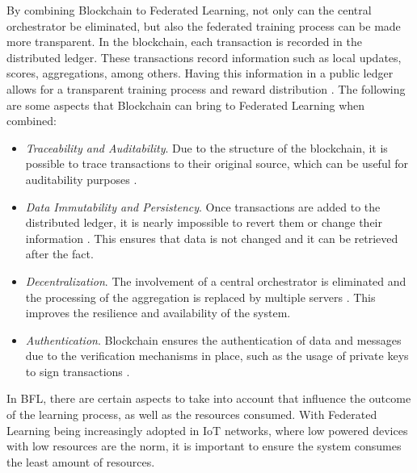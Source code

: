 By combining Blockchain to Federated Learning, not only can the central orchestrator be eliminated, but also the federated training process can be made more transparent. In the blockchain, each transaction is recorded in the distributed ledger. These transactions record information such as local updates, scores, aggregations, among others. Having this information in a public ledger allows for a transparent training process and reward distribution \cite{li_blockchain_2021}. The following are some aspects that Blockchain can bring to Federated Learning when combined:

\begin{itemize}
    \item \textit{Traceability and Auditability}. Due to the structure of the blockchain, it is possible to trace transactions to their original source, which can be useful for auditability purposes \cite{10.48550/arxiv.1902.01046, 10.48550/arxiv.2110.02182}.
    
    \item \textit{Data Immutability and Persistency}. Once transactions are added to the distributed ledger, it is nearly impossible to revert them or change their information \cite{10.48550/arxiv.1902.01046, qu_blockchain-enabled_2022}. This ensures that data is not changed and it can be retrieved after the fact.
    
    \item \textit{Decentralization}. The involvement of a central orchestrator is eliminated and the processing of the aggregation is replaced by multiple servers \cite{10.48550/arxiv.2009.09338, 9403374, 10.48550/arxiv.2110.02182, qu_blockchain-enabled_2022}. This improves the resilience and availability of the system.
    
    \item \textit{Authentication}. Blockchain ensures the authentication of data and messages due to the verification mechanisms in place, such as the usage of private keys to sign transactions \cite{qu_blockchain-enabled_2022}.
\end{itemize}

In BFL, there are certain aspects to take into account that influence the outcome of the learning process, as well as the resources consumed. With Federated Learning being increasingly adopted in IoT networks, where low powered devices with low resources are the norm, it is important to ensure the system consumes the least amount of resources.

